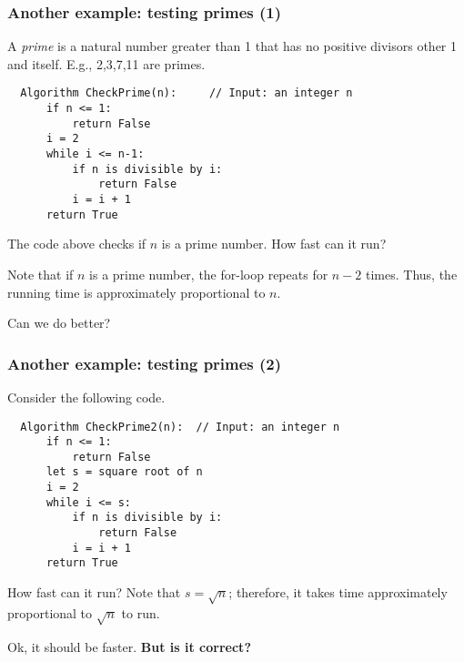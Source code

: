 \documentclass{beamer}
\begin{document}
\begin{frame}[fragile]\frametitle{Another example: testing primes (1)}
  A {\em prime} is a natural number greater than 1 that has no
  positive divisors other 1 and itself.  E.g., 2,3,7,11 are primes.
  \pause
  
  {\small
\begin{verbatim}
  Algorithm CheckPrime(n):     // Input: an integer n
      if n <= 1:
          return False
      i = 2
      while i <= n-1:
          if n is divisible by i:
              return False
          i = i + 1
      return True
\end{verbatim}
  }

  The code above checks if $n$ is a prime number.   How fast can it run?
  \pause

  Note that if $n$ is a prime number, the for-loop repeats for $n-2$
  times.  Thus, the running time is approximately proportional to
  $n$.
  \pause

  Can we do better?
\end{frame}

\begin{frame}[fragile]\frametitle{Another example: testing primes (2)}
  Consider the following code.
  
  {\small
\begin{verbatim}
  Algorithm CheckPrime2(n):  // Input: an integer n
      if n <= 1:
          return False
      let s = square root of n
      i = 2
      while i <= s:
          if n is divisible by i:
              return False
          i = i + 1
      return True
\end{verbatim}
  }

  How fast can it run? \pause Note that $s = \sqrt{n}$; therefore, it
  takes time approximately proportional to $\sqrt{n}$ to run.
  \pause

  Ok, it should be faster.  {\bf But is it correct?}

\end{frame}
\end{document}
